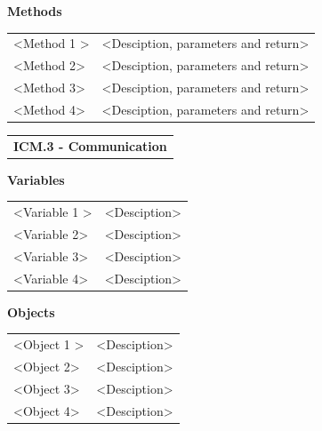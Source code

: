 \documentclass [10pt]{article}
\begin{document}
\textbf{Methods} 
\begin{longtable}{ p{ }  p{ }} \\ 

 
\rowcolor{tableCell} <Method 1 >& <Desciption, parameters and return>\\ 
<Method 2>& <Desciption, parameters and return>\\

\rowcolor{tableCell}<Method 3> & <Desciption, parameters and return> \\ 
<Method 4>& <Desciption, parameters and return> \\

\end{longtable}

\begin{longtable}{p{}}
\rowcolor{subsectionC}\textbf{ICM.3 - Communication} \\
\end{longtable}
  

\textbf{Variables} 

\begin{longtable}{ p{ }  p{ }} \\ 

 
\rowcolor{tableCell} <Variable 1 >& <Desciption> \\ 
<Variable 2>& <Desciption> \\

\rowcolor{tableCell}<Variable 3> & <Desciption> \\ 
<Variable 4>& <Desciption> \\

\end{longtable}

\textbf{Objects} 
\begin{longtable}{ p{ }  p{ }} \\ 

 
\rowcolor{tableCell} <Object 1 >& <Desciption> \\ 
<Object 2>& <Desciption> \\

\rowcolor{tableCell}<Object 3> & <Desciption> \\ 
<Object 4>& <Desciption> \\

\end{longtable}
\end{document}
